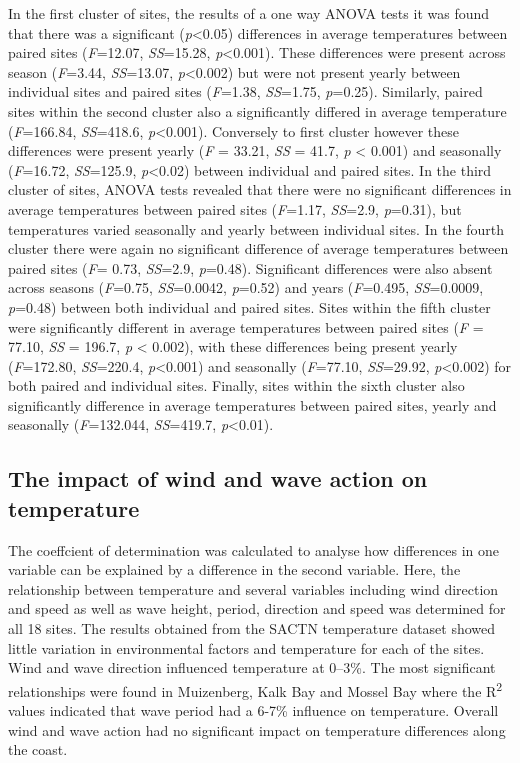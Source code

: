 \documentclass[12pt,A4paper,]{article}
\begin{document}
In the first cluster of sites, the results of a one way ANOVA tests it
was found that there was a significant (\emph{p}\textless{}0.05)
differences in average temperatures between paired sites
(\emph{F}=12.07, \emph{SS}=15.28, \emph{p}\textless{}0.001). These
differences were present across season (\emph{F}=3.44, \emph{SS}=13.07,
\emph{p}\textless{}0.002) but were not present yearly between individual
sites and paired sites (\emph{F}=1.38, \emph{SS}=1.75, \emph{p}=0.25).
Similarly, paired sites within the second cluster also a significantly
differed in average temperature (\emph{F}=166.84, \emph{SS}=418.6,
\emph{p}\textless{}0.001). Conversely to first cluster however these
differences were present yearly (\emph{F} = 33.21, \emph{SS} = 41.7,
\emph{p} \textless{} 0.001) and seasonally (\emph{F}=16.72,
\emph{SS}=125.9, \emph{p}\textless{}0.02) between individual and paired
sites. In the third cluster of sites, ANOVA tests revealed that there
were no significant differences in average temperatures between paired
sites (\emph{F}=1.17, \emph{SS}=2.9, \emph{p}=0.31), but temperatures
varied seasonally and yearly between individual sites. In the fourth
cluster there were again no significant difference of average
temperatures between paired sites (\emph{F}= 0.73, \emph{SS}=2.9,
\emph{p}=0.48). Significant differences were also absent across seasons
(\emph{F}=0.75, \emph{SS}=0.0042, \emph{p}=0.52) and years
(\emph{F}=0.495, \emph{SS}=0.0009, \emph{p}=0.48) between both
individual and paired sites. Sites within the fifth cluster were
significantly different in average temperatures between paired sites
(\emph{F} = 77.10, \emph{SS} = 196.7, \emph{p} \textless{} 0.002), with
these differences being present yearly (\emph{F}=172.80,
\emph{SS}=220.4, \emph{p}\textless{}0.001) and seasonally
(\emph{F}=77.10, \emph{SS}=29.92, \emph{p}\textless{}0.002) for both
paired and individual sites. Finally, sites within the sixth cluster
also significantly difference in average temperatures between paired
sites, yearly and seasonally (\emph{F}=132.044, \emph{SS}=419.7,
\emph{p}\textless{}0.01).

\subsection{The impact of wind and wave action on
temperature}\label{the-impact-of-wind-and-wave-action-on-temperature}

The coeffcient of determination was calculated to analyse how
differences in one variable can be explained by a difference in the
second variable. Here, the relationship between temperature and several
variables including wind direction and speed as well as wave height,
period, direction and speed was determined for all 18 sites. The results
obtained from the SACTN temperature dataset showed little variation in
environmental factors and temperature for each of the sites. Wind and
wave direction influenced temperature at 0--3\%. The most significant
relationships were found in Muizenberg, Kalk Bay and Mossel Bay where
the R\textsuperscript{2} values indicated that wave period had a 6-7\%
influence on temperature. Overall wind and wave action had no
significant impact on temperature differences along the coast.
\end{document}
